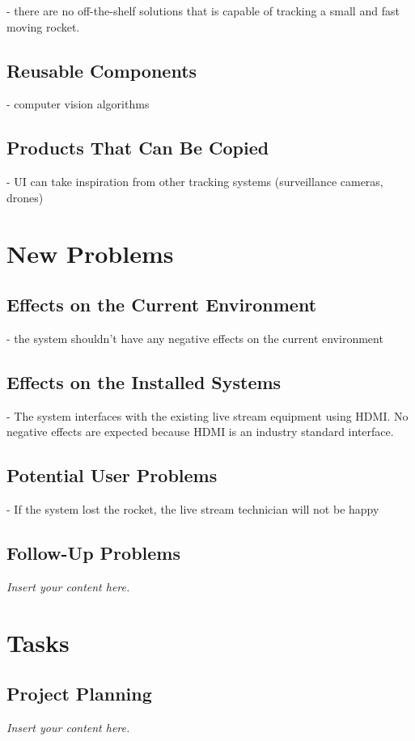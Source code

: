 \documentclass[12pt]{article}
\newcommand{\lips}{\textit{Insert your content here.}}
\begin{document}
- there are no off-the-shelf solutions that is capable of tracking a small and fast moving rocket.

\subsection{Reusable Components}

- computer vision algorithms

\subsection{Products That Can Be Copied}

- UI can take inspiration from other tracking systems (surveillance cameras, drones)

\section{New Problems}
\subsection{Effects on the Current Environment}

- the system shouldn't have any negative effects on the current environment

\subsection{Effects on the Installed Systems}

- The system interfaces with the existing live stream equipment using HDMI. No negative effects are expected because HDMI is an industry standard interface.

\subsection{Potential User Problems}

- If the system lost the rocket, the live stream technician will not be happy

\subsection{Follow-Up Problems}
\lips

\section{Tasks}
\subsection{Project Planning}
\lips
\end{document}
